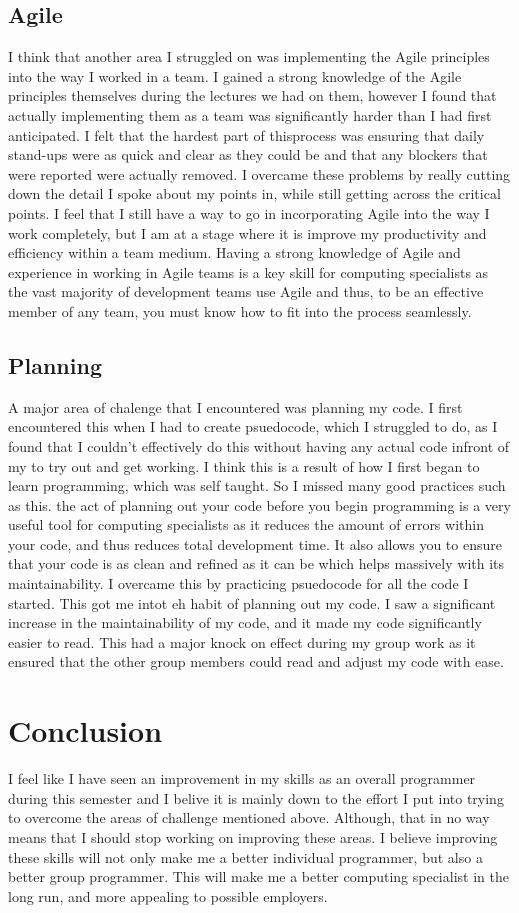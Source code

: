 \documentclass{scrartcl}
\begin{document}
\subsection{Agile}
I think that another area I struggled on was implementing the Agile principles into the way I worked in a team. I gained a strong knowledge of the Agile principles themselves during the lectures we had on them, however I found that actually implementing them as a team was significantly harder than I had first anticipated. I felt that the hardest part of thisprocess was ensuring that daily stand-ups were as quick and clear as they could be and that any blockers that were reported were actually removed. I overcame these problems by really cutting down the detail I spoke about my points in, while still getting across the critical points. I feel that I still have a way to go in incorporating Agile into the way I work completely, but I am at a stage where it is improve my productivity and efficiency within a team medium. Having a strong knowledge of Agile and experience in working in Agile teams is a key skill  for computing specialists as the vast majority of development teams use Agile and thus, to be an effective member of any team, you must know how to fit into the process seamlessly.

\subsection{Planning}
A major area of chalenge that I encountered was planning my code. I first encountered this when I had to create psuedocode, which I struggled to do, as I found that I couldn't effectively do this without having any actual code infront of my to try out and get working. I think this is a result of how I first began to learn programming, which was self taught. So I missed many good practices such as this. the act of planning out your code before you begin programming is a very useful tool for computing specialists as it reduces the amount of errors within your code, and thus reduces total development time. It also allows you to ensure that your code is as clean and refined as it can be which helps massively with its maintainability. I overcame this by practicing psuedocode for all the code I started. This got me intot eh habit of planning out my code. I saw a significant increase in the maintainability of my code, and it made my code significantly easier to read. This had a major knock on effect during my group work as it ensured that the other group members could read and adjust my code with ease.

\section{Conclusion}
I feel like I have seen an improvement in my skills as an overall programmer during this semester and I belive it is mainly down to the effort I put into trying to overcome the areas of challenge mentioned above. Although, that in no way means that I should stop working on improving these areas. I believe improving these skills will not only make me a better individual programmer, but also a better group programmer. This will make me a better computing specialist in the long run, and more appealing to possible employers.
\end{document}
